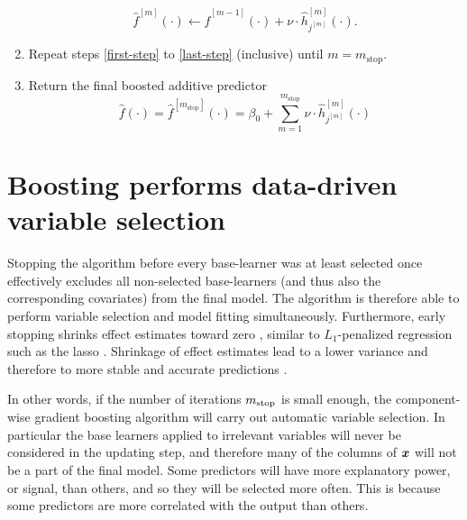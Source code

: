 \begin{algorithm}
\begin{enumerate}
        \begin{equation*}
            \hat{f}^{[m]}(\cdot)\gets \hat{f}^{[m-1]}(\cdot)+\nu\cdot \hat{h}_{j^{[m]}}^{[m]}(\cdot).
        \end{equation*}
    \item Repeat steps \ref{first-step} to \ref{last-step} (inclusive) until $m=m_{\text{stop}}$.
    \item Return the final boosted additive predictor
        \begin{equation*}
            \hat{f}(\cdot)=\hat{f}^{[m_{\text{stop}}]}(\cdot)=\beta_0+\sum_{m=1}^{m_{\text{stop}}}\nu\cdot\hat{h}_{j^{[m]}}^{[m]}(\cdot)
        \end{equation*}
\end{enumerate}
\end{algorithm}

\section{Boosting performs data-driven variable selection}\label{sec:variable-selection}
Stopping the algorithm before every base-learner was at least selected once effectively excludes all non-selected base-learners
(and thus also the corresponding covariates) from the final model.
The algorithm is therefore able to perform variable selection and model fitting simultaneously.
Furthermore, early stopping shrinks effect estimates toward zero \citep{buhlmann2007, DeBin2016}, similar to $L_1$-penalized regression
such as the lasso \citep{lasso, efron2004}.
Shrinkage of effect estimates lead to a lower variance and therefore to more stable and accurate predictions \citep{efron1975, copas1983, ESL}.


In other words, if the number of iterations $m_{\text{stop}}$ is small enough, the component-wise gradient boosting algorithm will carry out automatic variable selection.
In particular the base learners applied to irrelevant variables will never be considered in the updating step, and therefore many of the columns of $\bm{x}$ will not be a part of the final model.
Some predictors will have more explanatory power, or signal, than others, and so they will be selected more often.
This is because some predictors are more correlated with the output than others.


